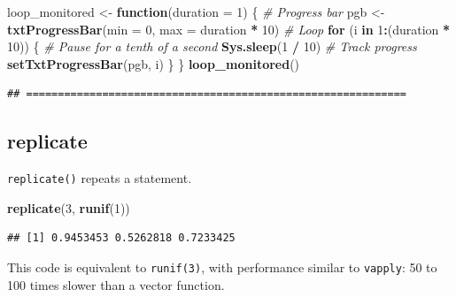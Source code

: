 \documentclass[
  12pt,
  american,
  a4paper,
  extrafontsizes,onecolumn,openright
  ]{memoir}
\newenvironment{Shaded}{\begin{snugshade}}{\end{snugshade}}
\newcommand{\AttributeTok}[1]{\textcolor[rgb]{0.13,0.29,0.53}{#1}}
\newcommand{\CommentTok}[1]{\textcolor[rgb]{0.56,0.35,0.01}{\textit{#1}}}
\newcommand{\ControlFlowTok}[1]{\textcolor[rgb]{0.13,0.29,0.53}{\textbf{#1}}}
\newcommand{\DecValTok}[1]{\textcolor[rgb]{0.00,0.00,0.81}{#1}}
\newcommand{\FunctionTok}[1]{\textcolor[rgb]{0.13,0.29,0.53}{\textbf{#1}}}
\newcommand{\NormalTok}[1]{#1}
\newcommand{\OtherTok}[1]{\textcolor[rgb]{0.56,0.35,0.01}{#1}}
\newcommand{\SpecialCharTok}[1]{\textcolor[rgb]{0.81,0.36,0.00}{\textbf{#1}}}
\newlength{\rf}
\begin{document}
\begin{Shaded}
\begin{Highlighting}[]
\NormalTok{loop\_monitored }\OtherTok{\textless{}{-}} \ControlFlowTok{function}\NormalTok{(}\AttributeTok{duration =} \DecValTok{1}\NormalTok{) \{}
  \CommentTok{\# Progress bar}
\NormalTok{  pgb }\OtherTok{\textless{}{-}} \FunctionTok{txtProgressBar}\NormalTok{(}\AttributeTok{min =} \DecValTok{0}\NormalTok{, }\AttributeTok{max =}\NormalTok{ duration }\SpecialCharTok{*} \DecValTok{10}\NormalTok{)}
  \CommentTok{\# Loop}
  \ControlFlowTok{for}\NormalTok{ (i }\ControlFlowTok{in} \DecValTok{1}\SpecialCharTok{:}\NormalTok{(duration }\SpecialCharTok{*} \DecValTok{10}\NormalTok{)) \{}
    \CommentTok{\# Pause for a tenth of a second}
    \FunctionTok{Sys.sleep}\NormalTok{(}\DecValTok{1} \SpecialCharTok{/} \DecValTok{10}\NormalTok{)}
    \CommentTok{\# Track progress}
    \FunctionTok{setTxtProgressBar}\NormalTok{(pgb, i)}
\NormalTok{  \}}
\NormalTok{\}}
\FunctionTok{loop\_monitored}\NormalTok{()}
\end{Highlighting}
\end{Shaded}

\begin{verbatim}
## ============================================================
\end{verbatim}

\normalsize

\subsection{replicate}\label{replicate}

\texttt{replicate()} repeats a statement.

\scriptsize

\begin{Shaded}
\begin{Highlighting}[]
\FunctionTok{replicate}\NormalTok{(}\DecValTok{3}\NormalTok{, }\FunctionTok{runif}\NormalTok{(}\DecValTok{1}\NormalTok{))}
\end{Highlighting}
\end{Shaded}

\begin{verbatim}
## [1] 0.9453453 0.5262818 0.7233425
\end{verbatim}

\normalsize

This code is equivalent to \texttt{runif(3)}, with performance similar to \texttt{vapply}: 50 to 100 times slower than a vector function.
\end{document}
